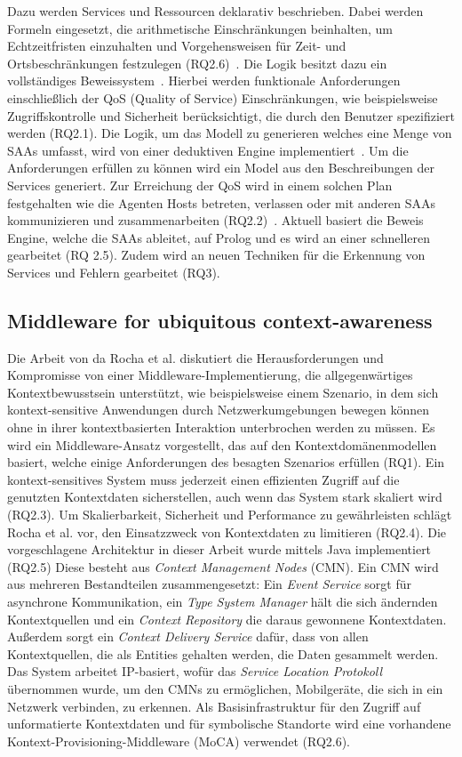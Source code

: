 \documentclass[conference,compsoc,ngerman]{IEEEtran}
\begin{document}
Dazu werden Services und Ressourcen deklarativ beschrieben.  
Dabei werden Formeln eingesetzt, die arithmetische Einschränkungen beinhalten, um Echtzeitfristen einzuhalten und Vorgehensweisen für Zeit- und Ortsbeschränkungen festzulegen (RQ2.6)~\cite{bharadwaj2005service}. Die Logik besitzt dazu ein vollständiges Beweissystem~\cite{bharadwaj2005service}. Hierbei werden funktionale Anforderungen einschließlich der QoS (Quality of Service) Einschränkungen, wie beispielsweise Zugriffskontrolle und Sicherheit berücksichtigt, die durch den Benutzer spezifiziert werden (RQ2.1). Die Logik, um das Modell zu generieren welches eine Menge von SAAs umfasst, wird von einer deduktiven Engine implementiert~\cite{bharadwaj2005service}. Um die Anforderungen erfüllen zu können wird ein Model aus den Beschreibungen der Services generiert. Zur Erreichung der QoS wird in einem solchen Plan festgehalten wie die Agenten Hosts betreten, verlassen oder mit anderen SAAs kommunizieren und zusammenarbeiten (RQ2.2)~\cite{bharadwaj2005service}. Aktuell basiert die Beweis Engine, welche die SAAs ableitet, auf Prolog und es wird an einer schnelleren gearbeitet (RQ 2.5). Zudem wird an neuen Techniken für die Erkennung von Services und Fehlern gearbeitet (RQ3).

\subsection{Middleware for ubiquitous context-awareness}
Die Arbeit von da Rocha et al. \cite{rocha2008middleware} diskutiert die Herausforderungen und Kompromisse von einer Middleware-Implementierung, die allgegenwärtiges Kontextbewusstsein unterstützt, wie beispielsweise einem Szenario, in dem sich kontext-sensitive Anwendungen durch Netzwerkumgebungen bewegen können ohne in ihrer kontextbasierten Interaktion unterbrochen werden zu müssen. Es wird ein Middleware-Ansatz vorgestellt, das auf den Kontextdomänenmodellen basiert, welche einige Anforderungen des besagten Szenarios erfüllen (RQ1). Ein kontext-sensitives System muss jederzeit einen effizienten Zugriff auf die genutzten Kontextdaten sicherstellen, auch wenn das System stark skaliert wird (RQ2.3). Um Skalierbarkeit, Sicherheit und Performance zu gewährleisten schlägt Rocha et al. \cite{rocha2008middleware} vor, den Einsatzzweck von Kontextdaten zu limitieren (RQ2.4). Die vorgeschlagene Architektur in dieser Arbeit wurde mittels Java implementiert (RQ2.5) Diese besteht aus \textit{Context Management Nodes} (CMN). Ein CMN wird aus mehreren Bestandteilen zusammengesetzt: Ein \textit{Event Service} sorgt für asynchrone Kommunikation, ein \textit{Type System Manager} hält die sich ändernden Kontextquellen und ein \textit{Context Repository} die daraus gewonnene Kontextdaten. Außerdem sorgt ein \textit{Context Delivery Service} dafür, dass von allen Kontextquellen, die als Entities gehalten werden, die Daten gesammelt werden. Das System arbeitet IP-basiert, wofür das \textit{Service Location Protokoll} übernommen wurde, um den CMNs zu ermöglichen, Mobilgeräte, die sich in ein Netzwerk verbinden, zu erkennen. Als Basisinfrastruktur für den Zugriff auf unformatierte Kontextdaten und für symbolische Standorte wird eine vorhandene Kontext-Provisioning-Middleware (MoCA) \cite{SER04} verwendet (RQ2.6). 
\end{document}
